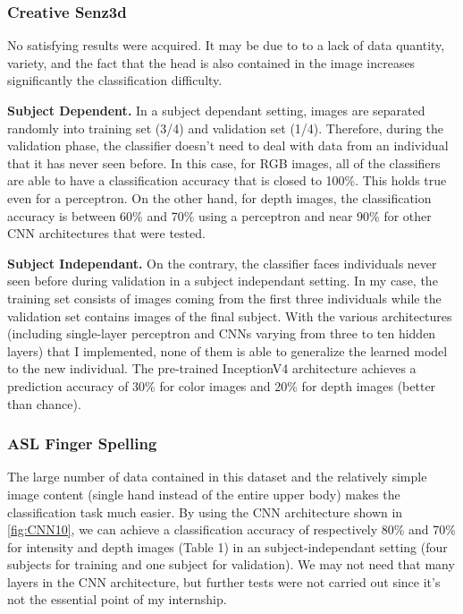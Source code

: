 \subsubsection{Creative Senz3d}

No satisfying results were acquired. It may be due to to a lack of data
quantity, variety, and the fact that the head is also contained in the
image increases significantly the classification difficulty.

\textbf{Subject Dependent.}
In a subject dependant setting, images are separated randomly into
training set (3/4) and validation set (1/4). Therefore, during the
validation phase, the classifier doesn't need to deal with data from an
individual that it has never seen before.
In this case, for RGB images, all of the classifiers are able to
have a classification accuracy that is closed to 100\%. This holds true
even for a perceptron.
On the other hand, for depth images, the classification accuracy is
between 60\% and 70\% using a perceptron and near 90\% for other CNN
architectures that were tested.

\textbf{Subject Independant.}
On the contrary, the classifier faces individuals never seen before
during validation in a subject independant setting. 
In my case, the training set consists of images coming from the
first three individuals while the validation set contains images of
the final subject.
With the various architectures (including single-layer perceptron
and CNNs varying from three to ten hidden layers)
that I implemented, none of them is able to generalize the learned model
to the new individual.
The pre-trained InceptionV4 architecture achieves a prediction accuracy
of 30\% for color images and 20\% for depth images (better than chance).

\subsubsection{ASL Finger Spelling}

The large number of data contained in this dataset and the relatively
simple image content (single hand instead of the entire upper body)
makes the classification task much easier. By using the CNN architecture
shown in \autoref{fig:CNN10}, we can achieve a classification accuracy
of respectively 80\% and 70\% for intensity and depth images (Table 1)
in an subject-independant setting (four subjects for training and one
subject for validation). We may not need that many layers in the CNN
architecture, but further tests were not carried out since it's not
the essential point of my internship.

